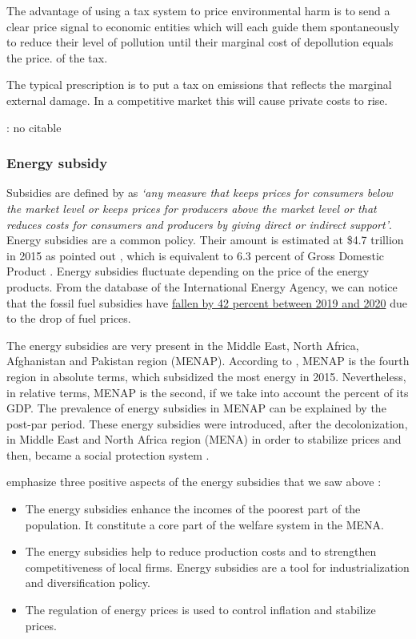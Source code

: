 \documentclass[
]{article}
\begin{document}
The advantage of using a tax system to price environmental harm is to
send a clear price signal to economic entities which will each guide
them spontaneously to reduce their level of pollution until their
marginal cost of depollution equals the price. of the tax.

The typical prescription is to put a tax on emissions that reflects the
marginal external damage. In a competitive market this will cause
private costs to rise.

\textcite{gueret} : no citable

\textcite{combet}

\hypertarget{energy-subsidy}{%
\subsubsection{Energy subsidy}\label{energy-subsidy}}

Subsidies are defined by \textcite{demoor1997} as \emph{`any measure
that keeps prices for consumers below the market level or keeps prices
for producers above the market level or that reduces costs for consumers
and producers by giving direct or indirect support'}. Energy subsidies
are a common policy. Their amount is estimated at \$4.7 trillion in 2015
as pointed out \textcite{coady2019}, which is equivalent to 6.3 percent
of Gross Domestic Product . Energy subsidies fluctuate depending on the
price of the energy products. From the database of the International
Energy Agency, we can notice that the fossil fuel subsidies have
\href{https://www.iea.org/topics/energy-subsidies}{fallen by 42 percent
between 2019 and 2020} due to the drop of fuel prices.

The energy subsidies are very present in the Middle East, North Africa,
Afghanistan and Pakistan region (MENAP). According to
\textcite{coady2019}, MENAP is the fourth region in absolute terms,
which subsidized the most energy in 2015. Nevertheless, in relative
terms, MENAP is the second, if we take into account the percent of its
GDP. The prevalence of energy subsidies in MENAP can be explained by the
post-par period. These energy subsidies were introduced, after the
decolonization, in Middle East and North Africa region (MENA) in order
to stabilize prices and then, became a social protection system
\autocite{verme2017}.

\textcite{fattouh2013} emphasize three positive aspects of the energy
subsidies that we saw above :

\begin{itemize}
\item
  The energy subsidies enhance the incomes of the poorest part of the
  population. It constitute a core part of the welfare system in the
  MENA.
\item
  The energy subsidies help to reduce production costs and to strengthen
  competitiveness of local firms. Energy subsidies are a tool for
  industrialization and diversification policy.
\item
  The regulation of energy prices is used to control inflation and
  stabilize prices.
\end{itemize}
\end{document}
